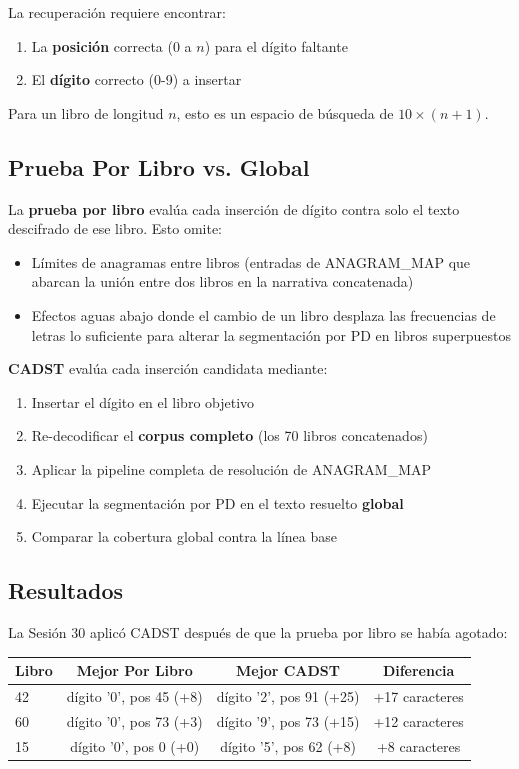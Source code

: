 \documentclass[11pt,a4paper]{article}
\begin{document}
La recuperación requiere encontrar:
\begin{enumerate}
\item La \textbf{posición} correcta (0 a $n$) para el dígito faltante
\item El \textbf{dígito} correcto (0-9) a insertar
\end{enumerate}

Para un libro de longitud $n$, esto es un espacio de búsqueda de $10 \times (n+1)$.

\subsection{Prueba Por Libro vs. Global}

La \textbf{prueba por libro} evalúa cada inserción de dígito contra solo el texto descifrado de ese libro. Esto omite:

\begin{itemize}
\item Límites de anagramas entre libros (entradas de ANAGRAM\_MAP que abarcan la unión entre dos libros en la narrativa concatenada)
\item Efectos aguas abajo donde el cambio de un libro desplaza las frecuencias de letras lo suficiente para alterar la segmentación por PD en libros superpuestos
\end{itemize}

\textbf{CADST} evalúa cada inserción candidata mediante:
\begin{enumerate}
\item Insertar el dígito en el libro objetivo
\item Re-decodificar el \textbf{corpus completo} (los 70 libros concatenados)
\item Aplicar la pipeline completa de resolución de ANAGRAM\_MAP
\item Ejecutar la segmentación por PD en el texto resuelto \textbf{global}
\item Comparar la cobertura global contra la línea base
\end{enumerate}

\subsection{Resultados}

La Sesión 30 aplicó CADST después de que la prueba por libro se había agotado:

\begin{table}[htbp]
\centering
\begin{tabular}{lccc}
\toprule
\textbf{Libro} & \textbf{Mejor Por Libro} & \textbf{Mejor CADST} & \textbf{Diferencia} \\
\midrule
42 & dígito '0', pos 45 (+8) & dígito '2', pos 91 (+25) & +17 caracteres \\
60 & dígito '0', pos 73 (+3) & dígito '9', pos 73 (+15) & +12 caracteres \\
15 & dígito '0', pos 0 (+0) & dígito '5', pos 62 (+8) & +8 caracteres \\
\bottomrule
\end{tabular}
\end{table}
\end{document}
